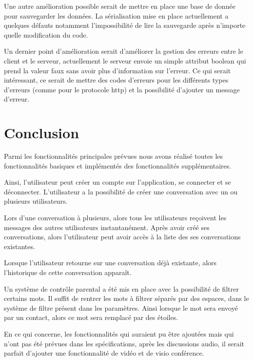 \par Une autre amélioration possible serait de mettre en place une base de donnée pour sauvegarder les données. La sérialisation mise en place actuellement a quelques défauts notamment l'impossibilité de lire la sauvegarde après n'importe quelle modification du code.

\par Un dernier point d’amélioration serait d’améliorer la gestion des erreurs entre le client et le serveur, actuellement le serveur envoie un simple attribut boolean qui prend la valeur faux sans avoir plus d'information sur l'erreur. Ce qui serait intéressant, ce serait de mettre des codes d'erreurs pour les différents types d'erreurs (comme pour le protocole http) et la possibilité d'ajouter un message d'erreur.

\newpage
\part{Conclusion}

\par Parmi les fonctionnalités principales prévues nous avons réalisé toutes les fonctionnalités basiques et implémentés des fonctionnalités supplémentaires. \\

\par Ainsi, l'utilisateur peut créer un compte sur l'application, se connecter et se déconnecter. L'utilisateur a la possibilité de créer une conversation avec un ou plusieurs utilisateurs. 
\par Lors d'une conversation à plusieurs, alors tous les utilisateurs reçoivent les messages des autres utilisateurs instantanément. Après avoir créé ses conversations, alors l'utilisateur peut avoir accès à la liste des ses conversations existantes.
\par Lorsque l'utilisateur retourne sur une conversation déjà existante, alors l'historique de cette conversation apparaît.
\par Un système de contrôle parental a été mis en place avec la possibilité de filtrer certains mots. Il suffit de rentrer les mots à filtrer séparés par des espaces, dans le système de filtre présent dans les paramètres. Ainsi lorsque le mot sera envoyé par un contact, alors ce mot sera remplacé par des étoiles.



En ce qui concerne, les fonctionnalités qui auraient pu être ajoutées mais qui n’ont pas été prévues dans les spécifications, après les discussions audio, il serait parfait d'ajouter une fonctionnalité de vidéo et de visio conférence. 